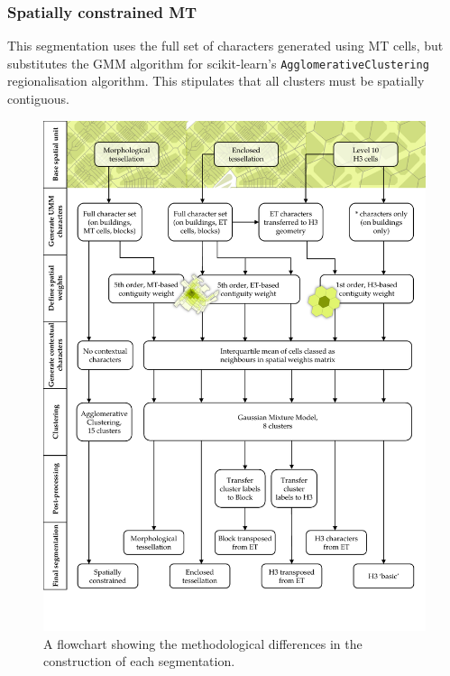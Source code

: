 \documentclass[a4paper, nobind]{templates/ociamthesis}
\begin{document}
\hypertarget{spatially-constrained-mt}{%
\subsubsection{Spatially constrained MT}\label{spatially-constrained-mt}}

This segmentation uses the full set of characters generated using MT cells, but substitutes the GMM algorithm for scikit-learn's \texttt{AgglomerativeClustering} regionalisation algorithm. This stipulates that all clusters must be spatially contiguous.

\begin{figure}

{\centering \includegraphics[width=.8\paperwidth]{figures/segmentations flowchart} 

}

\caption[A flowchart showing the methodological differences in the construction of each segmentation.]{A flowchart showing the methodological differences in the construction of each segmentation.}\label{fig:segmentation-flowchart}
\end{figure}
\end{document}
